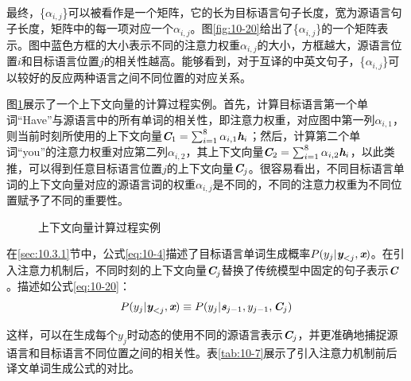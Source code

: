 \begin{itemize}
最终，\{$\alpha_{i,j}$\}可以被看作是一个矩阵，它的长为目标语言句子长度，宽为源语言句子长度，矩阵中的每一项对应一个$\alpha_{i,j}$。图\ref{fig:10-20}给出了\{$\alpha_{i,j}$\}的一个矩阵表示。图中蓝色方框的大小表示不同的注意力权重$\alpha_{i,j}$的大小，方框越大，源语言位置$i$和目标语言位置$j$的相关性越高。能够看到，对于互译的中英文句子，\{$\alpha_{i,j}$\}可以较好的反应两种语言之间不同位置的对应关系。

\vspace{0.5em}
\end{itemize}

\parinterval 图\ref{fig:10-21}展示了一个上下文向量的计算过程实例。首先，计算目标语言第一个单词“Have”与源语言中的所有单词的相关性，即注意力权重，对应图中第一列$\alpha_{i,1}$，则当前时刻所使用的上下文向量$\textbf{\em C}_1 = \sum_{i=1}^8 \alpha_{i,1} \textbf{\em h}_i$；然后，计算第二个单词“you”的注意力权重对应第二列$\alpha_{i,2}$，其上下文向量$\textbf{\em C}_2 = \sum_{i=1}^8 \alpha_{i,2} \textbf{\em h}_i$，以此类推，可以得到任意目标语言位置$j$的上下文向量$\textbf{\em C}_j$。很容易看出，不同目标语言单词的上下文向量对应的源语言词的权重$\alpha_{i,j}$是不同的，不同的注意力权重为不同位置赋予了不同的重要性。

\begin{figure}[htp]
\centering

\caption{上下文向量计算过程实例}
\label{fig:10-21}
\end{figure}

\parinterval 在\ref{sec:10.3.1}节中，公式\eqref{eq:10-4}描述了目标语言单词生成概率$ {P} (y_j | \textbf{\em y}_{<j},\textbf{\em x})$。在引入注意力机制后，不同时刻的上下文向量$\textbf{\em C}_j$替换了传统模型中固定的句子表示$\textbf{\em C}$。描述如公式\eqref{eq:10-20}：
\begin{eqnarray}
{P} (y_j | \textbf{\em y}_{<j},\textbf{\em x}) \equiv {P} (y_j | \textbf{\em s}_{j-1},y_{j-1},\textbf{\em C}_j )
\label{eq:10-20}
\end{eqnarray}

\parinterval 这样，可以在生成每个$y_j$时动态的使用不同的源语言表示$\textbf{\em C}_j$，并更准确地捕捉源语言和目标语言不同位置之间的相关性。表\ref{tab:10-7}展示了引入注意力机制前后译文单词生成公式的对比。
\vspace{0.5em}

